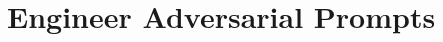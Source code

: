 \documentclass[11pt,
               aspectratio=169,
               hyperref={colorlinks}
               ]{beamer}
\begin{document}
					


	\section{Engineer Adversarial Prompts}
\end{document}
